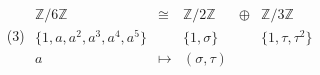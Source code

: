 \begin{DefBem}
{\begin{enumerate}
        \item[(3)] $\begin{array}{ccccc} \mathbb{Z}/6\mathbb{Z} & \cong &
        \mathbb{Z}/2\mathbb{Z} & \oplus & \mathbb{Z}/3\mathbb{Z} \\ 
        \{1,a,a^2,a^3,a^4,a^5\} & & \{1,\sigma\} & &\{1, \tau, \tau^2\}  \\    
        a & \mapsto & (\sigma, \tau) \end{array}$
    \end{enumerate}
    }
\end{DefBem}